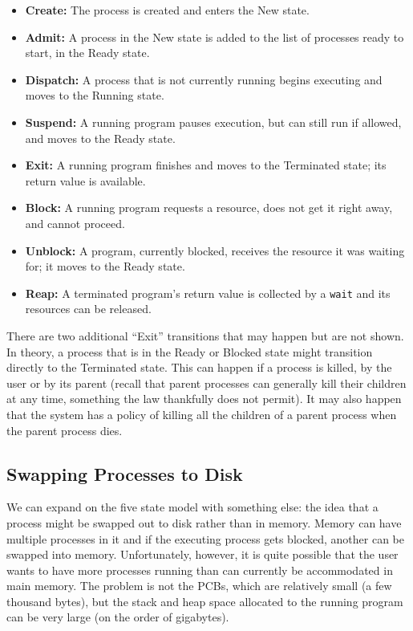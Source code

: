 \begin{itemize}
	\item \textbf{Create:} The process is created and enters the New state.
	\item \textbf{Admit:} A process in the New state is added to the list of processes ready to start, in the Ready state.
	\item \textbf{Dispatch:} A process that is not currently running begins executing and moves to the Running state.
	\item \textbf{Suspend:} A running program pauses execution, but can still run if allowed, and moves to the Ready state.
	\item \textbf{Exit:} A running program finishes and moves to the Terminated state; its return value is available.
	\item \textbf{Block:} A running program requests a resource, does not get it right away, and cannot proceed.
	\item \textbf{Unblock:} A program, currently blocked, receives the resource it was waiting for; it moves to the Ready state.
	\item \textbf{Reap:} A terminated program's return value is collected by a \texttt{wait} and its resources can be released.
\end{itemize}

There are two additional ``Exit'' transitions that may happen but are not shown. In theory, a process that is in the Ready or Blocked state might transition directly to the Terminated state. This can happen if a process is killed, by the user or by its parent (recall that parent processes can generally kill their children at any time, something the law thankfully does not permit). It may also happen that the system has a policy of killing all the children of a parent process when the parent process dies.

\subsection*{Swapping Processes to Disk}
We can expand on the five state model with something else: the idea that a process might be swapped out to disk rather than in memory. Memory can have multiple processes in it and if the executing process gets blocked, another can be swapped into memory. Unfortunately, however, it is quite possible that the user wants to have more processes running than can currently be accommodated in main memory. The problem is not the PCBs, which are relatively small (a few thousand bytes), but the stack and heap space allocated to the running program can be very large (on the order of gigabytes). 

